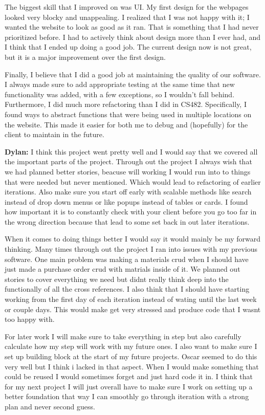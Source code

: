 \documentclass{article}
\begin{document}
The biggest skill that I improved on was UI. My first design for the webpages looked very blocky and unappealing. I realized that I was not happy with it; I wanted the website to look as good as it ran. That is something that I had never prioritized before. I had to actively think about design more than I ever had, and I think that I ended up doing a good job. The current design now is not great, but it is a major improvement over the first design. 

Finally, I believe that I did a good job at maintaining the quality of our software. I always made sure to add appropriate testing at the same time that new functionality was added, with a few exceptions, so I wouldn't fall behind. Furthermore, I did much more refactoring than I did in CS482. Specifically, I found ways to abstract functions that were being used in multiple locations on the website. This made it easier for both me to debug and (hopefully) for the client to maintain in the future. 

\textbf{Dylan:}
I think this project went pretty well and I would say that we covered all the important parts of the project. Through out the project I always wish that we had planned better stories, beacuse will working I would run into to things that were needed but never mentioned. Which would lead to refactoring of earlier iterations. Also make sure you start off early with scalable methods like search instead of drop down menus or like popups instead of tables or cards. I found how important it is to constantly check with your client before you go too far in the wrong direction because that lead to some set back in out later iterations.

When it comes to doing things better I would say it would mainly be my forward thinking. Many times through out the project I ran into issues with my previous software. One main problem was making a materials crud when I should have just made a purchase order crud with matrials inside of it. We planned out stories to cover everything we need but didnt really think deep into the functionally of all the cross references. I also think that I should have starting working from the first day of each iteration instead of wating until the last week or couple days. This would make get very stressed and produce code that I wasnt too happy with.

For later work I will make sure to take everything in step but also carefully calculate how my step will work with my future ones. I also want to make sure I set up building block at the start of my future projects. Oscar seemed to do this very well but I think i lacked in that aspect. When I would make something that could be reused I would sometimes forget and just hard code it in. I think that for my next project I will just overall have to make sure I work on setting up a better foundation that way I can smoothly go through iteration with a strong plan and never second guess.
\end{document}
